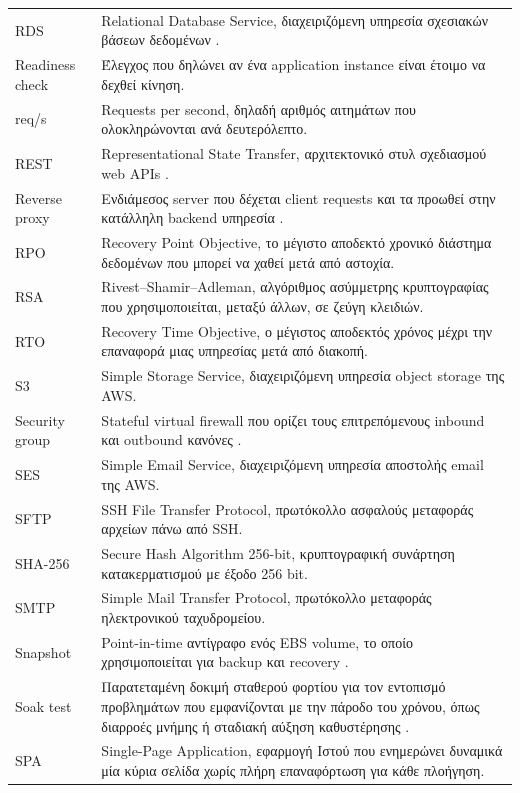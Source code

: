 \documentclass[12pt,a4paper,twoside,fleqn]{book}
\begin{document}
\begin{longtable}{@{}p{3.8cm}p{9.2cm}@{}}
RDS & Relational Database Service, διαχειριζόμενη υπηρεσία σχεσιακών βάσεων δεδομένων \cite{aws2026rds}.\\
Readiness check & Έλεγχος που δηλώνει αν ένα application instance είναι έτοιμο να δεχθεί κίνηση.\\
req/s & Requests per second, δηλαδή αριθμός αιτημάτων που ολοκληρώνονται ανά δευτερόλεπτο.\\
REST & Representational State Transfer, αρχιτεκτονικό στυλ σχεδιασμού web APIs \cite{fielding2000rest}.\\
Reverse proxy & Ενδιάμεσος server που δέχεται client requests και τα προωθεί στην κατάλληλη backend υπηρεσία \cite{nginx2026reverseproxy}.\\
RPO & Recovery Point Objective, το μέγιστο αποδεκτό χρονικό διάστημα δεδομένων που μπορεί να χαθεί μετά από αστοχία.\\
RSA & Rivest--Shamir--Adleman, αλγόριθμος ασύμμετρης κρυπτογραφίας που χρησιμοποιείται, μεταξύ άλλων, σε ζεύγη κλειδιών.\\
RTO & Recovery Time Objective, ο μέγιστος αποδεκτός χρόνος μέχρι την επαναφορά μιας υπηρεσίας μετά από διακοπή.\\
S3 & Simple Storage Service, διαχειριζόμενη υπηρεσία object storage της AWS.\\
Security group & Stateful virtual firewall που ορίζει τους επιτρεπόμενους inbound και outbound κανόνες \cite{aws2026securitygroups}.\\
SES & Simple Email Service, διαχειριζόμενη υπηρεσία αποστολής email της AWS.\\
SFTP & SSH File Transfer Protocol, πρωτόκολλο ασφαλούς μεταφοράς αρχείων πάνω από SSH.\\
SHA-256 & Secure Hash Algorithm 256-bit, κρυπτογραφική συνάρτηση κατακερματισμού με έξοδο 256 bit.\\
SMTP & Simple Mail Transfer Protocol, πρωτόκολλο μεταφοράς ηλεκτρονικού ταχυδρομείου.\\
Snapshot & Point-in-time αντίγραφο ενός EBS volume, το οποίο χρησιμοποιείται για backup και recovery \cite{aws2026ebs}.\\
Soak test & Παρατεταμένη δοκιμή σταθερού φορτίου για τον εντοπισμό προβλημάτων που εμφανίζονται με την πάροδο του χρόνου, όπως διαρροές μνήμης ή σταδιακή αύξηση καθυστέρησης \cite{grafana2026k6testing}.\\
SPA & Single-Page Application, εφαρμογή Ιστού που ενημερώνει δυναμικά μία κύρια σελίδα χωρίς πλήρη επαναφόρτωση για κάθε πλοήγηση.\\

\end{longtable}
\end{document}
